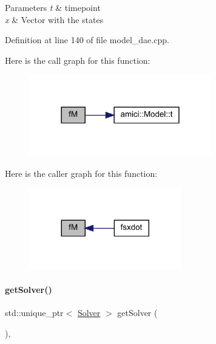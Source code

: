 \begin{DoxyParams}{Parameters}
{\em t} & timepoint \\
\hline
{\em x} & Vector with the states \\
\hline
\end{DoxyParams}


Definition at line 140 of file model\+\_\+dae.\+cpp.

Here is the call graph for this function\+:
\nopagebreak
\begin{figure}[H]
\begin{center}
\leavevmode
\includegraphics[width=225pt]{classamici_1_1_model___d_a_e_a82db0639f98056acc376569457c95ca4_cgraph}
\end{center}
\end{figure}
Here is the caller graph for this function\+:
\nopagebreak
\begin{figure}[H]
\begin{center}
\leavevmode
\includegraphics[width=188pt]{classamici_1_1_model___d_a_e_a82db0639f98056acc376569457c95ca4_icgraph}
\end{center}
\end{figure}
\mbox{\label{classamici_1_1_model___d_a_e_aee7564098e889917627afd3c00772f81}} 
\paragraph{\texorpdfstring{get\+Solver()}{getSolver()}}
{\footnotesize\ttfamily std\+::unique\+\_\+ptr$<$ \mbox{\hyperlink{classamici_1_1_solver}{Solver}} $>$ get\+Solver (\begin{DoxyParamCaption}{ }\end{DoxyParamCaption})\hspace{0.3cm}{\ttfamily [override]}, {\ttfamily [virtual]}}

